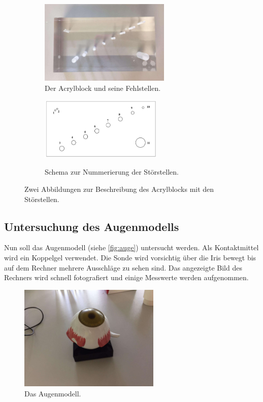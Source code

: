 \begin{figure}
    \begin{subfigure}{0.56\textwidth}
        \centering
        \includegraphics[height=4cm]{content/acrylblock_gedreht.pdf}
        \caption{Der Acrylblock und seine Fehlstellen.}
        \label{fig:acrylblock}
    \end{subfigure}
\hfill
    \begin{subfigure}{0.40\textwidth}
        \centering
        \includegraphics[height=3cm]{content/schema_block.jpg}
        \caption{Schema zur Nummerierung der Störstellen.}\cite{altprotokoll}
        \label{fig:schemablock}
    \end{subfigure}
    \caption{Zwei Abbildungen zur Beschreibung des Acrylblocks mit den Störstellen.}
\end{figure}

\subsection{Untersuchung des Augenmodells}
\label{subsec:auge}
Nun soll das Augenmodell (siehe \autoref{fig:auge}) untersucht werden.
Als Kontaktmittel wird ein Koppelgel verwendet.
Die Sonde wird vorsichtig über die Iris bewegt bis auf dem Rechner mehrere Ausschläge zu sehen sind.
Das angezeigte Bild des Rechners wird schnell fotografiert und einige Messwerte werden aufgenommen.

\begin{figure}
    \centering
    \includegraphics[width=0.6\textwidth]{content/auge.pdf}
    \caption{Das Augenmodell.}
    \label{fig:auge}
\end{figure}